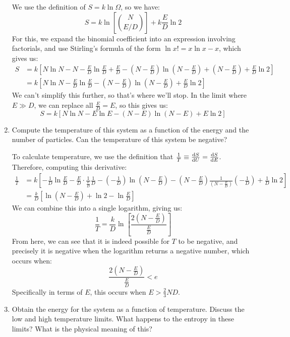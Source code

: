 \documentclass[10pt]{article}
\begin{document}
\begin{enumerate}[label=\alph*)]
			\begin{solution}
				We use the definition of $S = k \ln \Omega$, so we have:
				\[
					S = k \ln \left[{N \choose E / D}\right] + k\frac{E}{D} \ln 2
				\] 
				For this, we expand the binomial coefficient into an expression involving factorials, and 
				use Stirling's formula of the form $\ln x! = x \ln x - x$, which gives us:
				\begin{align*}
					S &= k\left[ N \ln N - N - \frac{E}{D}\ln \frac{E}{D} + \frac{E}{D} - 
						\left( N - \frac{E}{D} \right) \ln \left( N - \frac{E}{D} \right) + 
					\left( N - \frac{E}{D}\right) + \frac{E}{D}\ln 2\right]\\
						&= k\left[N \ln N - \frac{E}{D}\ln \frac{E}{D}- \left( N - \frac{E}{D} \right) 
						\ln \left( N - \frac{E}{D} \right) + \frac{E}{D}\ln 2\right]
				\end{align*}
				We can't simplify this further, so that's where we'll stop. In the limit where $E \gg D$, 
				we can replace all $\frac{E}{D} = E$, so this gives us:
				\[
					S = k\left[N \ln N - E \ln E - \left( N - E \right) \ln (N - E) + E \ln 2\right]
				\] 
			\end{solution}
		\item Compute the temperature of this system as a function of the energy and the number of particles. 
			Can the temperature of this system be negative?

			\begin{solution}
				To calculate temperature, we use the definition that $\frac{1}{T} \equiv \dv{S}{U} = \dv{S}{E}$.
				Therefore, computing this derivative:
				\begin{align*}
					\frac{1}{T} &= k \left[-\frac{1}{D}\ln \frac{E}{D} - \frac{E}{D} \cdot \frac{1}{\frac{E}{D}}
						\frac{1}{D} -\left(-\frac{1}{D}\right) \ln \left(N - \frac{E}{D}\right) -
						\left( N - \frac{E}{D} \right) \frac{1}{\left( N - \frac{E}{D} \right) } 
					\left( -\frac{1}{D} \right)  + \frac{1}{D} \ln 2\right]\\
								&= \frac{k}{D}\left[\ln\left( N - \frac{E}{D} \right) + \ln 2 - \ln \frac{E}{D}\right]
				\end{align*}
				We can combine this into a single logarithm, giving us:
				\[
					\frac{1}{T} = \frac{k}{D}\ln\left[\frac{2\left( N - \frac{E}{D} \right)}{\frac{E}{D}}\right]
				\] 
				From here, we can see that it is indeed possible for $T$ to be negative, and precisely it 
				is negative when the logarithm returns a negative number, which occurs when:
				\[
					\frac{2\left( N - \frac{E}{D} \right) }{\frac{E}{D}} < e
				\] 
				Specifically in terms of $E$, this occurs when $E > \frac{2}{3}ND$.
			\end{solution}
		\item Obtain the energy for the system as a function of temperature. Discuss the low and high temperature
			limits. What happens to the entropy in these limits? What is the physical meaning of this?


\end{enumerate}
\end{document}
